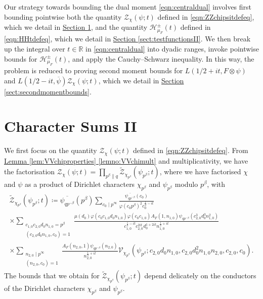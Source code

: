 \documentclass[11pt,a4paper]{amsart}
\newcommand{\HH}{\mathcal{H}}
\newcommand{\R}{\mathbb{R}}
\newcommand{\VV}{\mathcal{V}}
\newcommand{\ZZ}{\mathcal{Z}}
\numberwithin{equation}{section}
\theoremstyle{remark}
\theoremstyle{definition}
\begin{document}
Our strategy towards bounding the dual moment \eqref{eqn:centraldual} involves first bounding pointwise both the quantity $\ZZ_{\chi}(\psi;t)$ defined in \eqref{eqn:ZZchipsitdefeq}, which we detail in \hyperref[sect:charsumsII]{Section \ref*{sect:charsumsII}}, and the quantity $\HH_{\mu_F}^{\pm}(t)$ defined in \eqref{eqn:HHtdefeq}, which we detail in \hyperref[sect:testfunctionsII]{Section \ref*{sect:testfunctionsII}}. We then break up the integral over $t \in \R$ in \eqref{eqn:centraldual} into dyadic ranges, invoke pointwise bounds for $\HH_{\mu_F}^{\pm}(t)$, and apply the Cauchy--Schwarz inequality. In this way, the problem is reduced to proving second moment bounds for $L(1/2 + it,F \otimes \psi)$ and $L(1/2 - it,\overline{\psi}) \ZZ_{\chi}(\psi;t)$, which we detail in \hyperref[sect:secondmomentbounds]{Section \ref*{sect:secondmomentbounds}}.


\section{Character Sums II}
\label{sect:charsumsII}

We first focus on the quantity $\ZZ_{\chi}(\psi;t)$ defined in \eqref{eqn:ZZchipsitdefeq}. From \hyperref[lemno:VVchimult]{Lemma \ref*{lem:VVchiproperties} \ref*{lemno:VVchimult}} and multiplicativity, we have the factorisation $\ZZ_{\chi}(\psi;t) = \prod_{p^{\beta} \parallel q} \widetilde{\ZZ}_{\chi_{p^{\beta}}}(\psi_{p^{\beta}};t)$, where we have factorised $\chi$ and $\psi$ as a product of Dirichlet characters $\chi_{p^{\beta}}$ and $\psi_{p^{\beta}}$ modulo $p^{\beta}$, with
\begin{multline}
\label{eqn:tildeZZchipsitdefeq}
\widetilde{\ZZ}_{\chi_{p^{\beta}}}(\psi_{p^{\beta}};t) \coloneqq \overline{\psi_{qp^{-\beta}}}(p^{\beta}) \sum_{c_0 \mid p^{\infty}} \frac{\overline{\psi_{qp^{-\beta}}}(c_0)}{\varphi(c_0 p^{\beta})^2 c_0^{\frac{1}{2} - it}}	\\
\times \sum_{\substack{c_{1,0} c_{2,0} d_0 n_{1,0} = p^{\beta} \\ (c_{2,0} d_0 n_{1,0},c_0) = 1}} \frac{\mu(d_0) \varphi(c_0 c_{1,0} d_0 n_{1,0}) \varphi(c_0 c_{1,0}) A_F(1,n_{1,0}) \psi_{qp^{-\beta}}(c_{2,0}^3 d_0^3 n_{1,0}^2)}{c_{1,0}^{\frac{1}{2} - it} c_{2,0}^{2it} d_0^{1 + 2it} n_{1,0}^{\frac{1}{2} + it}}	\\
\times \sum_{\substack{n_{2,0} \mid p^{\infty} \\ (n_{2,0},c_0) = 1}} \frac{A_F(n_{2,0},1) \psi_{qp^{-\beta}}(n_{2,0})}{n_{2,0}^{\frac{1}{2} + it}} \VV_{\chi_{p^{\beta}}}(\psi_{p^{\beta}}; c_{2,0} d_0 n_{1,0}, c_{2,0} d_0^2 n_{1,0} n_{2,0}, c_{2,0}, c_0).
\end{multline}
The bounds that we obtain for $\widetilde{\ZZ}_{\chi_{p^{\beta}}}(\psi_{p^{\beta}};t)$ depend delicately on the conductors of the Dirichlet characters $\chi_{p^{\beta}}$ and $\psi_{p^{\beta}}$.
\end{document}
